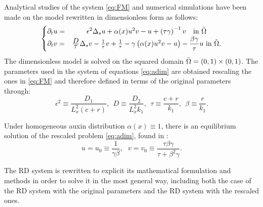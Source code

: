 Analytical studies of the system \eqref{eq:FM} and numerical simulations have been made on the model rewritten in dimensionless form as follows:
\begin{equation} \label{eq:adim} \begin{aligned}
\left\lbrace
\begin{matrix}
\partial_t u = & \epsilon^2 \Delta_s u + \alpha(x)u^2 v - u + \left( \tau \gamma \right)^{-1} v \ \ \ \text{in} \ \Tilde{\Omega} \\
    \partial_t v = & {\displaystyle D \over \displaystyle \tau} \Delta_s v - \frac{1}{\tau} v + \frac{1}{\tau} - \gamma \left( \alpha(x) u^2 v - u\right) - \displaystyle{ \beta \gamma \over \displaystyle \tau} u \ \text{in} \ \Tilde{\Omega}.
\end{matrix}
\right.
\end{aligned}\end{equation}
The dimensionless model is solved on the squared domain $\Tilde{\Omega} = (0,1) \times (0,1)$.
The parameters used in the system of equations  \eqref{eq:adim} are obtained rescaling the ones in \eqref{eq:FM} and therefore defined in terms of the original parameters through:
\begin{equation}
    \epsilon^2 \equiv \frac{D_1}{L_x^2 (c+r)}, \ \  D \equiv \frac{D_2}{L_x^2k_1}, \ \  \tau \equiv \frac{c+r}{k_1}, \ \ \beta \equiv \frac{r}{k_1}.
\end{equation}

Under homogeneous auxin distribution $\alpha(x) \equiv 1$, there is an equilibrium solution  of the rescaled problem \eqref{eq:adim}, found in \cite{intra2}:
\begin{equation}\label{eq:u0v0}
    u = u_0 \equiv \frac{1}{\gamma \beta}, \ \ \ v = v_0 \equiv \frac{\tau \beta \gamma}{\tau + \beta^2 \gamma}.
\end{equation}

The RD system is rewritten to explicit its mathematical formulation and methods in order to solve it in the most general way, including both the case of the RD system with the original parameters and the RD system with the rescaled ones.

